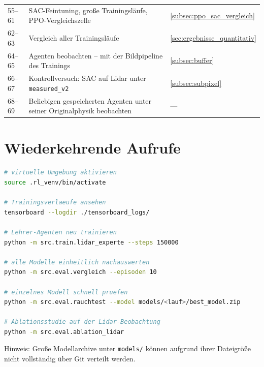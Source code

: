\begin{table}[htbp]
\begin{tabularx}{\linewidth}{@{}l X l@{}}
    55--61 & SAC-Feintuning, große Trainingsläufe, PPO-Vergleichszelle & \ref{subsec:ppo_sac_vergleich} \\
    62--63 & Vergleich aller Trainingsläufe & \ref{sec:ergebnisse_quantitativ} \\
    64--65 & Agenten beobachten -- mit der Bildpipeline des Trainings & \ref{subsec:buffer} \\
    66--67 & Kontrollversuch: SAC auf Lidar unter \texttt{measured\_v2} & \ref{subsec:subpixel} \\
    68--69 & Beliebigen gespeicherten Agenten unter seiner Originalphysik beobachten & --- \\
    \bottomrule
  \end{tabularx}
\end{table}

\section{Wiederkehrende Aufrufe}

\begin{lstlisting}[language=bash,caption={Häufig benötigte Kommandos.},label={lst:kommandos}]
# virtuelle Umgebung aktivieren
source .rl_venv/bin/activate

# Trainingsverlaeufe ansehen
tensorboard --logdir ./tensorboard_logs/

# Lehrer-Agenten neu trainieren
python -m src.train.lidar_experte --steps 150000

# alle Modelle einheitlich nachauswerten
python -m src.eval.vergleich --episoden 10

# einzelnes Modell schnell pruefen
python -m src.eval.rauchtest --model models/<lauf>/best_model.zip

# Ablationsstudie auf der Lidar-Beobachtung
python -m src.eval.ablation_lidar
\end{lstlisting}

\noindent
Hinweis: Große Modellarchive unter \texttt{models/} können aufgrund ihrer Dateigröße nicht vollständig über Git verteilt werden.
